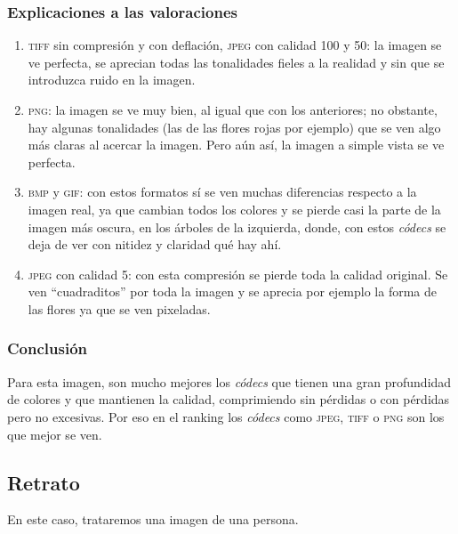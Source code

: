 \documentclass[11pt,a4paper]{article}
\begin{document}
\subsubsection{Explicaciones a las valoraciones}
\begin{enumerate}
	\item \textsc{tiff} sin compresión y con deflación, \textsc{jpeg} con calidad 100 y 50: la imagen se ve perfecta, se aprecian todas las tonalidades fieles a la realidad y sin que se introduzca ruido en la imagen.
	\item \textsc{png}: la imagen se ve muy bien, al igual que con los anteriores; no obstante, hay algunas tonalidades (las de las flores rojas por ejemplo) que se ven algo más claras al acercar la imagen. Pero aún así, la imagen a simple vista se ve perfecta.
	\item \textsc{bmp} y \textsc{gif}: con estos formatos sí se ven muchas diferencias respecto a la imagen real, ya que cambian todos los colores y se pierde casi la parte de la imagen más oscura, en los árboles de la izquierda, donde, con estos \textit{códecs} se deja de ver con nitidez y claridad qué hay ahí.
	\item \textsc{jpeg} con calidad 5: con esta compresión se pierde toda la calidad original. Se ven ``cuadraditos'' por toda la imagen y se aprecia por ejemplo la forma de las flores ya que se ven pixeladas.
\end{enumerate}

\subsubsection{Conclusión}

Para esta imagen, son mucho mejores los \textit{códecs} que tienen una gran profundidad de colores y que mantienen la calidad, comprimiendo sin pérdidas o con pérdidas pero no excesivas. Por eso en el ranking los \textit{códecs} como \textsc{jpeg}, \textsc{tiff} o \textsc{png} son los que mejor se ven.

\newpage

\subsection{Retrato}

En este caso, trataremos una imagen de una persona.
\end{document}

